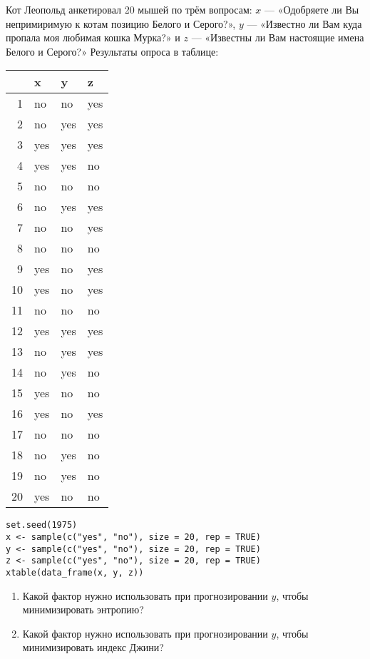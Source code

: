 \begin{problem}
Кот Леопольд анкетировал 20 мышей по трём вопросам: $x$ — «Одобряете ли Вы непримиримую к котам позицию Белого и Серого?», $y$ — «Известно ли Вам куда пропала моя любимая кошка Мурка?» и $z$ — «Известны ли Вам настоящие имена Белого и Серого?» Результаты опроса в таблице:

\begin{tabular}{rlll}
  \hline
 & x & y & z \\ 
  \hline
1 & no & no & yes \\ 
  2 & no & yes & yes \\ 
  3 & yes & yes & yes \\ 
  4 & yes & yes & no \\ 
  5 & no & no & no \\ 
  6 & no & yes & yes \\ 
  7 & no & no & yes \\ 
  8 & no & no & no \\ 
  9 & yes & no & yes \\ 
  10 & yes & no & yes \\ 
  11 & no & no & no \\ 
  12 & yes & yes & yes \\ 
  13 & no & yes & yes \\ 
  14 & no & yes & no \\ 
  15 & yes & no & no \\ 
  16 & yes & no & yes \\ 
  17 & no & no & no \\ 
  18 & no & yes & no \\ 
  19 & no & yes & no \\ 
  20 & yes & no & no \\ 
   \hline
\end{tabular}

\begin{verbatim}
set.seed(1975)
x <- sample(c("yes", "no"), size = 20, rep = TRUE)
y <- sample(c("yes", "no"), size = 20, rep = TRUE)
z <- sample(c("yes", "no"), size = 20, rep = TRUE)
xtable(data_frame(x, y, z))
\end{verbatim}



\begin{enumerate}
\item Какой фактор нужно использовать при прогнозировании $y$, чтобы минимизировать энтропию?
\item Какой фактор нужно использовать при прогнозировании $y$, чтобы минимизировать индекс Джини?
\end{enumerate}


\begin{sol}
\end{sol}
\end{problem}





